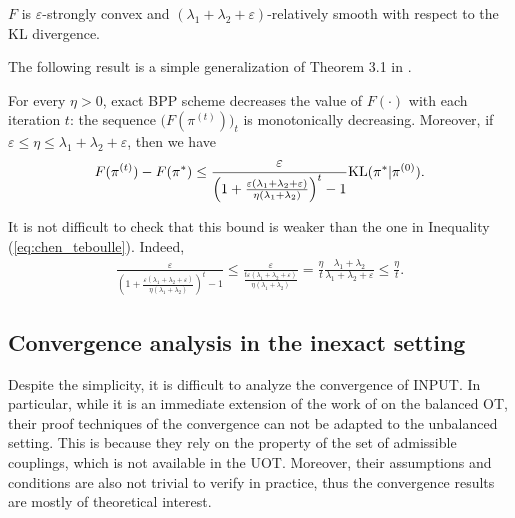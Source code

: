 \begin{lemma}
  \label{lemma:convex-smoothness}
  $F$ is $\varepsilon$-strongly convex and $(\lambda_1 + \lambda_2 + \varepsilon)$-relatively smooth
  with respect to the KL divergence.
\end{lemma}
The following result is a simple generalization of Theorem 3.1 in \citep{Lu18}.
\begin{proposition}
  \label{prop:convergence-exact-sppa}
  For every $\eta > 0$, exact BPP scheme decreases the value of $F(\cdot)$ with each iteration $t$:
  the sequence $\big( F(\pi^{(t)}) \big)_t$ is monotonically decreasing.
  Moreover, if $\varepsilon \leq \eta \leq \lambda_1 + \lambda_2 + \varepsilon$,
  then we have
  \begin{align}
    F(\pi^{(t)}) - F(\pi^*)
    \leq \frac{\varepsilon}{\left( 1 +
    \frac{\varepsilon (\lambda_1 + \lambda_2 + \varepsilon)}{\eta (\lambda_1 + \lambda_2)} \right)^t - 1}
    \text{KL}(\pi^* | \pi^{(0)}).
  \end{align}
\end{proposition}
It is not difficult to check that this bound is weaker than the one in
Inequality (\ref{eq:chen_teboulle}). Indeed,
\begin{align}
  \frac{\varepsilon}{\left( 1 +
  \frac{\varepsilon (\lambda_1 + \lambda_2 + \varepsilon)}{\eta (\lambda_1 + \lambda_2)} \right)^t - 1}
  \leq \frac{\varepsilon}{\frac{t \varepsilon(\lambda_1 + \lambda_2 + \varepsilon)}{\eta (\lambda_1 + \lambda_2)}}
  = \frac{\eta}{t} \frac{\lambda_1 + \lambda_2}{\lambda_1 + \lambda_2 + \varepsilon}
  \leq \frac{\eta}{t}.
\end{align}

\subsection{Convergence analysis in the inexact setting}

Despite the simplicity, it is difficult to analyze the convergence of INPUT.
In particular, while it is an immediate extension of the work of \citep{Xie20} on the balanced OT,
their proof techniques of the convergence can not be adapted to the unbalanced setting.
This is because they rely on the property of the set of admissible couplings,
which is not available in the UOT. Moreover, their assumptions and conditions are also
not trivial to verify in practice, thus the convergence results are mostly of theoretical interest.

